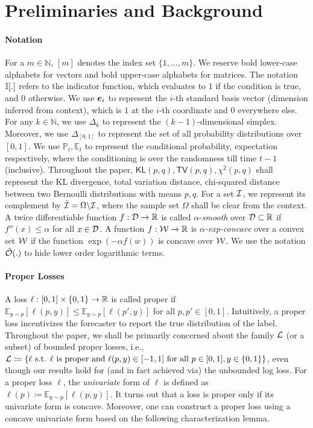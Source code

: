 \section{Preliminaries and Background}\label{sec:preliminaries}

\paragraph{Notation} For a $m \in \mathbb{N}$, $[m]$ denotes the index set $\{1, \dots, m\}$. We reserve bold lower-case alphabets for vectors and bold upper-case alphabets for matrices. The notation $\mathbb{I}{\left[.\right]}$ refers to the indicator function, which evaluates to $1$ if the condition is true, and $0$ otherwise. We use ${\bm{e}}_{i}$ to represent the $i$-th standard basis vector (dimension inferred from context), which is $1$ at the $i$-th coordinate and $0$ everywhere else. 
For any $k \in \mathbb{N}$, we use $\Delta_{k}$ to represent the $(k - 1)$-dimensional simplex. Moreover, we use $\Delta_{[0, 1]}$ to represent the set of all probability distributions over $[0, 1]$. We use $\mathbb{P}_{t}, \mathbb{E}_{t}$ to represent the conditional probability, expectation respectively, where the conditioning is over the randomness till time $t - 1$ (inclusive). Throughout the paper, $\mathsf{KL}(p, q), \mathsf{TV}(p, q), \chi^{2}(p, q)$ shall represent the KL divergence, total variation distance, chi-squared distance between two Bernoulli distributions with means $p, q$. 
For a set $\mathcal{I}$, we represent its complement by $\bar{\mathcal{I}} = \Omega \backslash \mathcal{I}$, where the sample set $\Omega$ shall be clear from the context.
A twice differentiable function $f: \mathcal{D} \to {\mathbb{R}}$ is called $\alpha$-\textit{smooth} over $\mathcal{D} \subset {\mathbb{R}}$ if $f''(x) \le \alpha$ for all $x \in \mathcal{D}$. A function $f: \mathcal{W} \to {\mathbb{R}}$ is \textit{$\alpha$-exp-concave} over a convex set $\mathcal{W}$ if the function $\exp(-\alpha f(w))$ is concave over $\mathcal{W}$. We use the notation $\tilde{\mathcal{O}}(.)$ to hide lower order logarithmic terms.

\paragraph{Proper Losses} A loss $\ell: [0, 1] \times \{0, 1\} \to {\mathbb{R}}$ is called proper if $\mathbb{E}_{y \sim p} [\ell(p, y)] \le \mathbb{E}_{y \sim p}[\ell(p', y)]$ for all $p, p' \in [0, 1]$. Intuitively, a proper loss incentivizes the forecaster to report the true distribution of the label. Throughout the paper, we shall be primarily concerned about the family $\mathcal{L}$ (or a subset) of bounded proper losses, i.e., $\mathcal{L} \coloneqq \{\ell \text{ s.t. } \ell \text{ is proper and } \ell(p, y) \in [-1, 1] \text{ for all } p \in [0, 1], y \in \{0, 1\}\}$, even though our results hold for (and in fact achieved via) the unbounded log loss. For a proper loss $\ell$, the \textit{univariate} form of $\ell$ is defined as $\ell(p) \coloneqq \mathbb{E}_{y \sim p}[\ell(p, y)]$. 
It turns out that a loss is proper only if its univariate form is concave.
Moreover, one can construct a proper loss using a concave univariate form based on the following characterization lemma.

